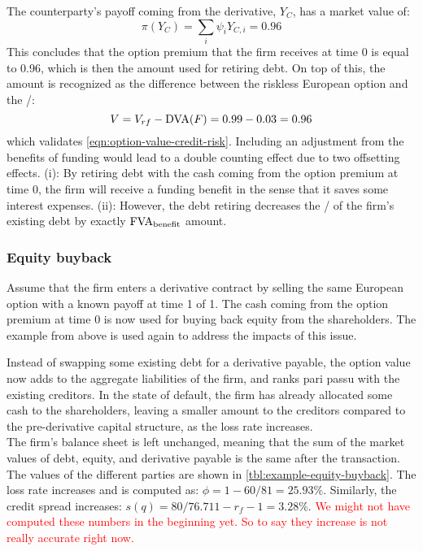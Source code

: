 \documentclass[../main.tex]{subfiles}
\begin{document}
            The counterparty's payoff coming from the derivative, $Y_C$, has a market value of:
            \begin{equation}
                \pi(Y_{C}) = \sum_i \psi_i Y_{C,i} = 0.96
            \end{equation}
            This concludes that the option premium that the firm receives at time 0 is equal to 0.96, 
            which is then the amount used for retiring debt. 
            On top of this, the amount is recognized as the difference between the riskless European option and the \DVA/:
            \begin{equation}
                V = V_{rf} - \text{\DVA/}(F) = 0.99 - 0.03 = 0.96
            \end{equation}
            which validates \cref{eqn:option-value-credit-risk}. 
            Including an adjustment from the benefits of funding 
            would lead to a double counting effect due to two offsetting effects. 
            (i): By retiring debt with the cash coming from the option premium at time 0, 
            the firm will receive a funding benefit in the sense that it saves some interest expenses. 
            (ii): However, the debt retiring decreases the \DVA/ of the firm's existing debt 
            by exactly $\text{\FVA/}_{\text{benefit}}$ amount.

        \subsubsection{Equity buyback}
            Assume that the firm enters a derivative contract 
            by selling the same European option with a known payoff at time 1 of 1. 
            The cash coming from the option premium at time 0 is now used for buying back equity from the shareholders. 
            The example from above is used again to address the impacts of this issue.

            Instead of swapping some existing debt for a derivative payable, 
            the option value now adds to the aggregate liabilities of the firm, 
            and ranks pari passu with the existing creditors. 
            In the state of default, the firm has already allocated some cash to the shareholders, 
            leaving a smaller amount to the creditors compared to the pre-derivative capital structure, 
            as the loss rate increases.\\
            The firm's balance sheet is left unchanged, meaning that the sum of the market values of debt, equity, 
            and derivative payable is the same after the transaction. 
            The values of the different parties are shown in \cref{tbl:example-equity-buyback}. 
            The loss rate increases and is computed as: $\phi = 1 - 60/81 = 25.93\%$. 
            Similarly, the credit spread increases: $s(q) = 80/76.711 - r_f - 1 = 3.28\%$. 
            \textcolor{red}{We might not have computed these numbers in the beginning yet. So to say they increase is not really accurate right now.}
\end{document}
